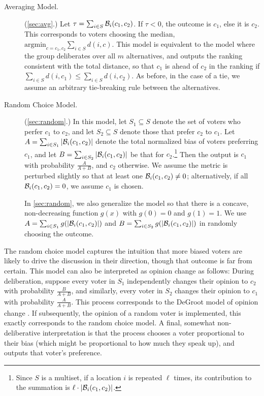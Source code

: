 \begin{description}
\item[Averaging Model.] (\cref{sec:avg}.) Let $\tau = \sum_{i \in S} \mathcal{B}_i(c_1,c_2)$. If $\tau < 0$, the outcome is $c_1$, else it is $c_2$. This corresponds to voters choosing the median, $\mbox{argmin}_{c = c_1,c_2} \sum_{i \in S} d(i,c)$. This model is equivalent to the model where the group deliberates over all $m$ alternatives, and outputs the ranking consistent with the total distance, so that $c_1$ is ahead of $c_2$ in the ranking if $ \sum_{i \in S} d(i,c_1) \le \sum_{i \in S} d(i,c_2)$. As before, in the case of a tie, we assume an arbitrary tie-breaking rule between the alternatives.
\item[Random Choice Model.] (\cref{sec:random}.) In this model, let $S_1 \subseteq S$ denote the set of voters who perfer $c_1$ to $c_2$, and let $S_2 \subseteq S$ denote those that prefer $c_2$ to $c_1$. Let $A = \sum_{i \in S_1} |\mathcal{B}_i(c_1,c_2)|$ denote the total normalized bias of voters preferring $c_1$, and let $B = \sum_{i \in S_2} |\mathcal{B}_i(c_1,c_2)|$ be that for $c_2$.\footnote{Since $S$ is a multiset, if a location $i$ is repeated $\ell$ times, its contribution to the summation is $\ell \cdot |\mathcal{B}_i(c_1,c_2)|$.} Then the output is $c_1$ with probability $\frac{A}{A+B}$, and $c_2$ otherwise. %
We assume the metric is perturbed slightly so that at least one $\mathcal{B}_i(c_1,c_2) \neq 0$; alternatively, if all $\mathcal{B}_i(c_1,c_2) = 0$, we assume $c_1$ is chosen.

In \cref{sec:random}, we also generalize the model so that there is a concave, non-decreasing function $g(x)$ with $g(0) = 0$ and $g(1) = 1$. We use $A = \sum_{i \in S_1} g(|\mathcal{B}_i(c_1,c_2)|)$ and $B = \sum_{i \in S_2} g(|\mathcal{B}_i(c_1,c_2)|)$ in randomly choosing the outcome.
\end{description}

The random choice model captures the intuition that more biased voters are likely to drive the discussion in their direction, though that outcome is far from certain. This model can also be interpreted as opinion change as follows: During deliberation, suppose every voter in $S_1$ independently changes their opinion to $c_2$ with probability $\frac{B}{A+B}$, and similarly, every voter in $S_2$ changes their opinion to $c_1$ with probability $\frac{A}{A+B}$. This process corresponds to the DeGroot model of opinion change \cite{degroot1974reaching}. If subsequently, the opinion of a random voter is implemented, this exactly corresponds to the random choice model. A final, somewhat non-deliberative interpretation is that the process chooses a voter proportional to their bias (which might be proportional to how much they speak up), and outputs that voter's preference. 

